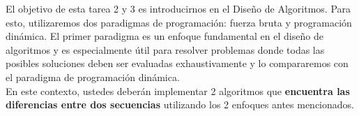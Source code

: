 El objetivo de esta tarea 2 y 3 es introducirnos en el Diseño de Algoritmos. Para esto, utilizaremos dos paradigmas de programación: fuerza bruta y programación dinámica. El primer paradigma es un enfoque fundamental en el diseño de algoritmos y es especialmente útil para resolver problemas donde todas las posibles soluciones deben ser evaluadas exhaustivamente y lo compararemos con el paradigma de programación dinámica. \\

En este contexto, ustedes deberán implementar 2 algoritmos que \textbf{encuentra las diferencias entre dos secuencias}  utilizando los 2 enfoques antes mencionados.